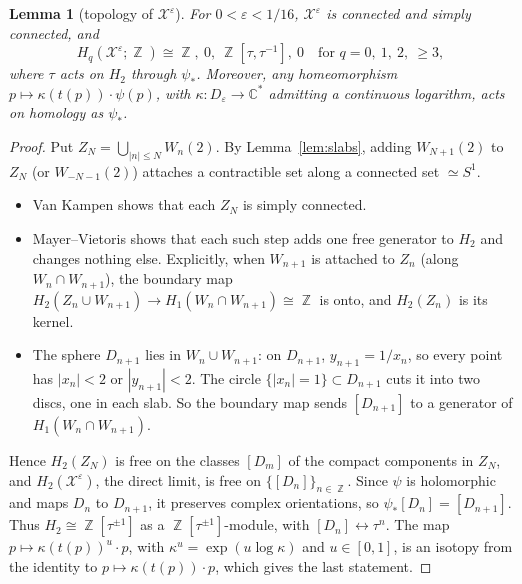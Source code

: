 \documentclass{article}
\DeclareMathOperator{\Z}{\mathbb{Z}}
\newtheorem{lemma}[theorem]{Lemma}
\theoremstyle{definition}
\theoremstyle{plain}
\newcommand{\C}{\mathbb{C}}
\newcommand{\cX}{\mathcal{X}}
\begin{document}
\begin{lemma}[topology of $\cX^\varepsilon$]\label{lem:Xtop}
For $0<\varepsilon<1/16$, $\cX^\varepsilon$ is connected and simply connected, and
\[H_q(\cX^\varepsilon;\Z)\cong\Z,\ 0,\ \Z[\tau,\tau^{-1}],\ 0\quad\text{for } q=0,\ 1,\ 2,\ \ge3,\]
where $\tau$ acts on $H_2$ through $\psi_*$. Moreover, any homeomorphism
$p\mapsto\kappa(t(p))\cdot\psi(p)$, with $\kappa\colon D_\varepsilon\to\C^*$ admitting a continuous logarithm, acts on homology as $\psi_*$.
\end{lemma}
\begin{proof}
Put $Z_N=\bigcup_{|n|\le N}W_n(2)$. By Lemma~\ref{lem:slabs}, adding $W_{N+1}(2)$ to
$Z_N$ (or $W_{-N-1}(2)$) attaches a contractible set along a connected set
$\simeq S^1$.
\begin{itemize}
\item Van Kampen shows that each $Z_N$ is simply connected.
\item Mayer--Vietoris shows that each such step adds one free generator to $H_2$
  and changes nothing else. Explicitly, when $W_{n+1}$ is attached to $Z_n$ (along
  $W_n\cap W_{n+1}$), the boundary map $H_2(Z_n\cup W_{n+1})\to H_1(W_n\cap W_{n+1})\cong\Z$ is
  onto, and $H_2(Z_n)$ is its kernel.
\item The sphere $D_{n+1}$ lies in $W_n\cup W_{n+1}$: on $D_{n+1}$, $y_{n+1}=1/x_n$, so
  every point has $|x_n|<2$ or $|y_{n+1}|<2$. The circle $\{|x_n|=1\}\subset D_{n+1}$
  cuts it into two discs, one in each slab. So the boundary map sends $[D_{n+1}]$ to a
  generator of $H_1(W_n\cap W_{n+1})$.
\end{itemize}
Hence $H_2(Z_N)$ is free on the classes $[D_m]$ of the compact components in
$Z_N$, and $H_2(\cX^\varepsilon)$, the direct limit, is free on $\{[D_n]\}_{n\in\Z}$.
Since $\psi$ is holomorphic and maps $D_n$ to $D_{n+1}$, it preserves complex
orientations, so $\psi_*[D_n]=[D_{n+1}]$. Thus $H_2\cong\Z[\tau^{\pm1}]$ as a
$\Z[\tau^{\pm1}]$-module, with $[D_n]\leftrightarrow\tau^n$.
The map $p\mapsto\kappa(t(p))^u\cdot p$, with $\kappa^u=\exp(u\log\kappa)$ and
$u\in[0,1]$, is an isotopy from the identity to $p\mapsto\kappa(t(p))\cdot p$, which
gives the last statement.
\end{proof}
\end{document}
